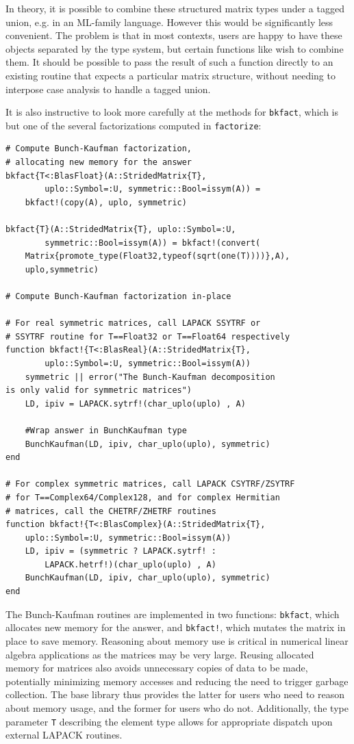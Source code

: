 \documentclass[pldi]{sigplanconf-pldi15}
\begin{document}
In theory, it is possible to combine these structured matrix types under a
tagged union, e.g. in an ML-family language. However this would be
significantly less convenient. The problem is that in most contexts,
users are happy to have these objects separated by the type system, but
certain functions like  wish to combine them. It should be
possible to pass the result of such a function directly to an existing
routine that expects a particular matrix structure, without needing to
interpose case analysis to handle a tagged union.

It is also instructive to look more carefully at the methods for \verb|bkfact|,
which is but one of the several factorizations computed in \verb|factorize|:

\begin{lstlisting}
# Compute Bunch-Kaufman factorization,
# allocating new memory for the answer
bkfact{T<:BlasFloat}(A::StridedMatrix{T},
        uplo::Symbol=:U, symmetric::Bool=issym(A)) =
    bkfact!(copy(A), uplo, symmetric)

bkfact{T}(A::StridedMatrix{T}, uplo::Symbol=:U,
        symmetric::Bool=issym(A)) = bkfact!(convert(
    Matrix{promote_type(Float32,typeof(sqrt(one(T))))},A),
    uplo,symmetric)

# Compute Bunch-Kaufman factorization in-place

# For real symmetric matrices, call LAPACK SSYTRF or
# SSYTRF routine for T==Float32 or T==Float64 respectively
function bkfact!{T<:BlasReal}(A::StridedMatrix{T},
        uplo::Symbol=:U, symmetric::Bool=issym(A))
    symmetric || error("The Bunch-Kaufman decomposition
is only valid for symmetric matrices")
    LD, ipiv = LAPACK.sytrf!(char_uplo(uplo) , A)

    #Wrap answer in BunchKaufman type
    BunchKaufman(LD, ipiv, char_uplo(uplo), symmetric)
end

# For complex symmetric matrices, call LAPACK CSYTRF/ZSYTRF
# for T==Complex64/Complex128, and for complex Hermitian
# matrices, call the CHETRF/ZHETRF routines 
function bkfact!{T<:BlasComplex}(A::StridedMatrix{T},
	uplo::Symbol=:U, symmetric::Bool=issym(A))
    LD, ipiv = (symmetric ? LAPACK.sytrf! :
        LAPACK.hetrf!)(char_uplo(uplo) , A)
    BunchKaufman(LD, ipiv, char_uplo(uplo), symmetric)
end
\end{lstlisting}

The Bunch-Kaufman routines are implemented in two functions: \verb|bkfact|,
which allocates new memory for the answer, and \verb|bkfact!|, which mutates
the matrix in place to save memory. Reasoning about memory use is critical in
numerical linear algebra applications as the matrices may be very large.
Reusing allocated memory for matrices also avoids unnecessary copies of data to
be made, potentially minimizing memory accesses and reducing the need to
trigger garbage collection. The base library thus provides the latter for users
who need to reason about memory usage, and the former for users who do not.
Additionally, the type parameter \verb|T| describing the element type allows
for appropriate dispatch upon external LAPACK routines.
\end{document}
